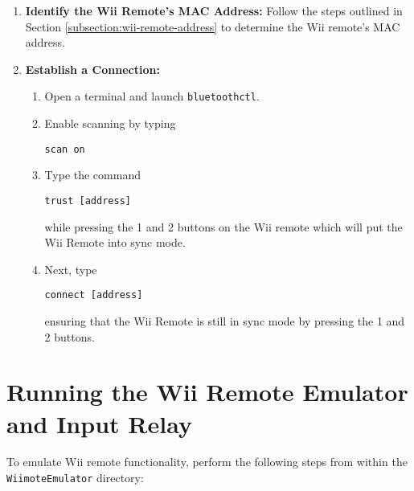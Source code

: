 \begin{enumerate}
	\item \textbf{Identify the Wii Remote's MAC Address:}
	      Follow the steps outlined in Section \ref{subsection:wii-remote-address} to determine the Wii remote's MAC address.

	\item \textbf{Establish a Connection:}
	      \begin{enumerate}
		      \item Open a terminal and launch \texttt{bluetoothctl}.
		      \item Enable scanning by typing
		            \begin{verbatim}
scan on
\end{verbatim}
		      \item Type the command
		            \begin{verbatim}
trust [address]
        \end{verbatim}
		            while pressing the 1 and 2 buttons on the Wii remote which will put the Wii Remote into sync mode.
		      \item Next, type
		            \begin{verbatim}
connect [address]
        \end{verbatim}
		            ensuring that the Wii Remote is still in sync mode by pressing the 1 and 2 buttons.
	      \end{enumerate}
\end{enumerate}


\section{Running the Wii Remote Emulator and Input Relay}

To emulate Wii remote functionality, perform the following steps from within the \texttt{WiimoteEmulator} directory:

